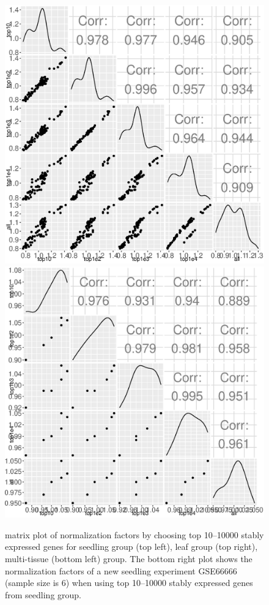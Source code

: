 \documentclass[11pt, a4paper]{article}
\begin{document}
\begin{figure}[h!]
\begin{center}
\includegraphics[scale=0.4]{Figures/norm3.eps}
\includegraphics[scale=0.4]{Figures/norm4.eps}
\caption{\label{fig:normfactor} matrix plot of normalization factors by choosing top 10--10000 stably expressed genes for seedling group (top left), leaf group (top right), multi-tissue (bottom left) group. The bottom right plot shows the normalization factors of a new seedling experiment GSE66666 (sample size is 6) when using top 10--10000 stably expressed genes from seedling group.}
\end{center}
\end{figure}
\end{document}
